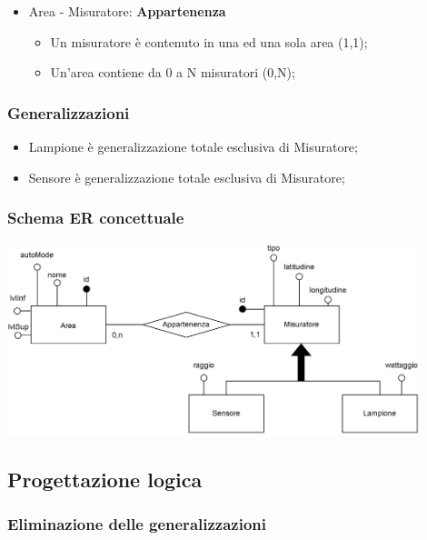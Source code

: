 \begin{itemize}

    \item Area - Misuratore: \textbf{Appartenenza}
    \begin{itemize}
        \item Un misuratore è contenuto in una ed una sola area (1,1);
        \item Un'area contiene da 0 a N misuratori (0,N);
    \end{itemize}
    
\end{itemize}

\subsubsection{Generalizzazioni}

\begin{itemize}
    \item Lampione è generalizzazione totale esclusiva di Misuratore;
    \item Sensore è generalizzazione totale esclusiva di Misuratore;
\end{itemize}

\subsubsection{Schema ER concettuale}

\begin{center}
    \includegraphics[width=12cm]{contenuti/specifica-basi-dati/img-sbd/anagrafica_concettuale.png}
\end{center}

\subsection{Progettazione logica}

\subsubsection{Eliminazione delle generalizzazioni}

